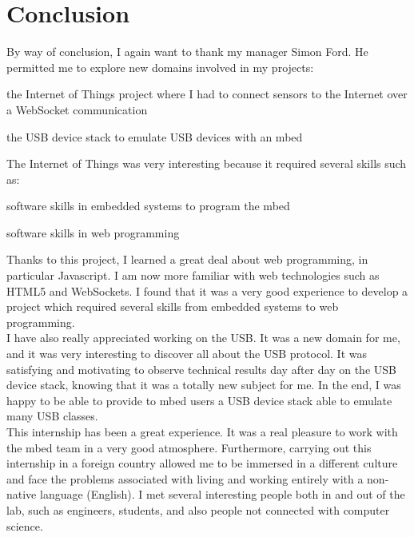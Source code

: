 \documentclass[pdftex,10pt,a4paper]{report}
\newenvironment{packed_item}{
\begin{itemize}
  \setlength{\itemsep}{1pt}
  \setlength{\parskip}{0pt}
  \setlength{\parsep}{0pt}
}{\end{itemize}}
\begin{document}
\chapter{Conclusion}
By way of conclusion, I again want to thank my manager Simon Ford. He permitted me to explore new domains involved in my projects:
\begin{packed_item}
	\item the Internet of Things project where I had to connect sensors to the Internet over a WebSocket communication
	\item the USB device stack to emulate USB devices with an mbed
\end{packed_item}

The Internet of Things was very interesting because it required several skills such as:
\begin{packed_item}
	\item software skills in embedded systems to program the mbed
	\item software skills in web programming
\end{packed_item}


Thanks to this project, I learned a great deal about web programming, in particular Javascript. I am now more familiar with web technologies such as HTML5 and WebSockets. I found that it was a very good experience to develop a project which required several skills from embedded systems to web programming. \\


I have also really appreciated working on the USB. It was a new domain for me, and it was very interesting to discover all about the USB protocol. It was satisfying and motivating to observe technical results day after day on the USB device stack, knowing that it was a totally new subject for me. In the end, I was happy to be able to provide to mbed users a USB device stack able to emulate many USB classes. \\


This internship has been a great experience. It was a real pleasure to work with the mbed team in a very good atmosphere. Furthermore, carrying out this
internship in a foreign country allowed me to be immersed in a different culture and face the problems associated with living and working entirely with a non-native language (English). I met several interesting people both in and out of the lab, such as engineers, students, and also people not connected with computer science.
\end{document}
